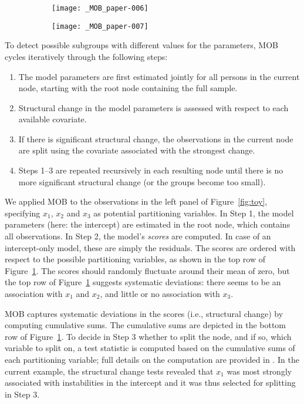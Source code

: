\documentclass[doc,floatsintext,natbib]{apa7}
\begin{document}
\begin{figure}[h]
\caption{Top row: Residuals ordered by the values of the partitioning variables. Bottom row: Summed residuals (cumulative sums for continuous predictors, sums by level for categorical predictors).}
\begin{subfigure}[][][t]{1.2\textwidth}
\texttt{[image: \_MOB\_paper-006]}

\texttt{[image: \_MOB\_paper-007]}
\end{subfigure}
\label{fig:efp}
\end{figure}


To detect possible subgroups with different values for the parameters, MOB cycles iteratively through the following steps:

\begin{enumerate}
\setlength\itemsep{0.25em}
\item The model parameters are first estimated jointly for all persons in the current node, starting with the root node containing the full sample.
\item Structural change in the model parameters is assessed with respect to each available covariate.
\item If there is significant structural change, the observations in the current node are split using the covariate associated with the strongest change.
\item Steps 1--3 are repeated recursively in each resulting node until there is no more significant structural change (or the groups become too small).
\end{enumerate}

We applied MOB to the observations in the left panel of Figure~\ref{fig:toy}, specifying $x_1$, $x_2$ and $x_3$ as potential partitioning variables. In Step 1, the model parameters (here: the intercept) are estimated in the root node, which contains all observations. %
In Step 2, the model's \emph{scores} are computed. In case of an intercept-only model, these are simply the residuals. The scores are ordered with respect to the possible partitioning variables, as shown in the top row of Figure~\ref{fig:efp}. The scores should randomly fluctuate around their mean of zero, but the top row of Figure~\ref{fig:efp} suggests systematic deviations: there seems to be an association with $x_1$ and $x_2$, and little or no association with $x_3$. 

MOB captures systematic deviations in the scores (i.e., structural change) by computing cumulative sums. The cumulative sums are depicted in the bottom row of Figure~\ref{fig:efp}. To decide in Step 3 whether to split the node, and if so, which variable to split on, a test statistic is computed based on the cumulative sums of each partitioning variable; full details on the computation are provided in \citep{ZeilyHoth08}. In the current example, the structural change tests revealed that $x_1$ was most strongly associated with instabilities in the intercept and it was thus selected for splitting in Step 3. 
\end{document}
